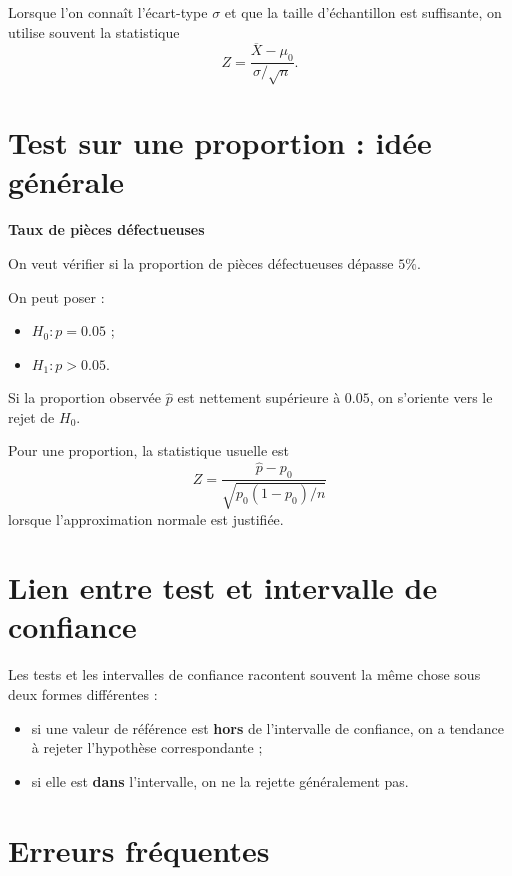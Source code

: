 \begin{Prop}
Lorsque l'on connaît l'écart-type $\sigma$ et que la taille d'échantillon est suffisante, on utilise souvent la statistique
$$
Z=\frac{\overline{X}-\mu_0}{\sigma/\sqrt{n}}.
$$
\end{Prop}

\section{Test sur une proportion : idée générale}

\begin{Ex}
\textbf{Taux de pièces défectueuses}

On veut vérifier si la proportion de pièces défectueuses dépasse $5\%$.

On peut poser :
\begin{itemize}
    \item $H_0 : p = 0.05$ ;
    \item $H_1 : p > 0.05$.
\end{itemize}

Si la proportion observée $\widehat{p}$ est nettement supérieure à $0.05$, on s'oriente vers le rejet de $H_0$.
\end{Ex}

\begin{Prop}
Pour une proportion, la statistique usuelle est
$$
Z=\frac{\widehat{p}-p_0}{\sqrt{p_0(1-p_0)/n}}
$$
lorsque l'approximation normale est justifiée.
\end{Prop}

\section{Lien entre test et intervalle de confiance}

\begin{Rmq}
Les tests et les intervalles de confiance racontent souvent la même chose sous deux formes différentes :
\begin{itemize}
    \item si une valeur de référence est \textbf{hors} de l'intervalle de confiance, on a tendance à rejeter l'hypothèse correspondante ;
    \item si elle est \textbf{dans} l'intervalle, on ne la rejette généralement pas.
\end{itemize}
\end{Rmq}

\section{Erreurs fréquentes}

